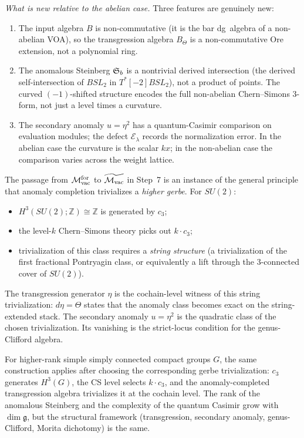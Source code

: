 \begin{construction}
\emph{What is new relative to the abelian case.}
Three features are genuinely new:
\begin{enumerate}[label=\textup{(\arabic*)}]
\item The input algebra $B$ is non-commutative (it is the bar
 dg~algebra of a non-abelian VOA), so the transgression algebra
 $B_\Theta$ is a non-commutative Ore extension, not a polynomial
 ring.
\item The anomalous Steinberg $\mathfrak{S}_b$ is a nontrivial derived
 intersection (the derived self-intersection of
 \(BSL_2\) in \(T^*[-2]BSL_2\)), not a
 product of points. The curved $(-1)$-shifted structure encodes
 the full non-abelian Chern--Simons $3$-form, not just a level
 times a curvature.
\item The secondary anomaly $u=\eta^2$ has a quantum-Casimir
 comparison on evaluation modules; the defect
 \(\mathcal E_\lambda\) records the normalization error. In the
 abelian case the curvature is the scalar \(kx\); in the
 non-abelian case the comparison varies across the weight lattice.
\end{enumerate}
\end{construction}

\begin{remark}
\label{rem:su2-string-structure}
The passage from $\mathcal{M}_{\mathrm{vac}}^{\mathrm{for}}$ to $\widetilde{\mathcal{M}_{\mathrm{vac}}}$ in Step~7 is
an instance of the general principle that anomaly completion
trivializes a \emph{higher gerbe}. For $SU(2)$:
\begin{itemize}
\item $H^3(SU(2);\mathbb Z)\cong\mathbb Z$ is generated by $c_3$;
\item the level-$k$ Chern--Simons theory picks out $k\cdot c_3$;
\item trivialization of this class requires a \emph{string structure}
 (a trivialization of the first fractional Pontryagin class, or
 equivalently a lift through the $3$-connected cover of $SU(2)$).
\end{itemize}
The transgression generator $\eta$ is the cochain-level witness of
this string trivialization: $d\eta = \Theta$ states that the anomaly
class becomes exact on the string-extended stack. The secondary
anomaly \(u=\eta^2\) is the quadratic class of the chosen
trivialization.  Its vanishing is the strict-locus condition for the
genus-Clifford algebra.

For higher-rank simple simply connected compact groups \(G\), the
same construction applies after choosing the corresponding gerbe
trivialization:
$c_3$ generates $H^3(G)$, the CS level selects $k\cdot c_3$, and
the anomaly-completed transgression algebra trivializes it at the
cochain level. The rank of the anomalous Steinberg and the
complexity of the quantum Casimir grow with
$\dim\mathfrak{g}$, but the structural framework
(transgression, secondary anomaly, genus-Clifford, Morita
dichotomy) is the same.
\end{remark}

